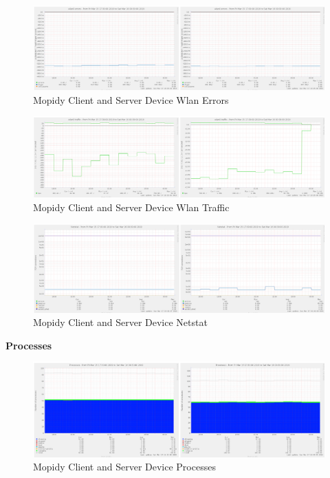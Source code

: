 \documentclass[11pt,a4paper]{scrreprt}
\begin{document}
\begin{figure}[H]
\includegraphics{ResultsAndAnalysis/MopidyServerTestImages/022MopidyWlan0Errors.png}
\centering
\caption{Mopidy Client and Server Device Wlan Errors}
\label{MopidyWlanError}
\end{figure}

\begin{figure}[H]
\includegraphics{ResultsAndAnalysis/MopidyServerTestImages/023MopidyWlan0Traffic.png}
\centering
\caption{Mopidy Client and Server Device Wlan Traffic}
\label{MopidyWlanTraffic}
\end{figure}

\begin{figure}[H]
\includegraphics{ResultsAndAnalysis/MopidyServerTestImages/018MopidyNetstat.png}
\centering
\caption{Mopidy Client and Server Device Netstat}
\label{MopidyNetstat}
\end{figure}

\textbf{Processes}

\begin{figure}[H]
\includegraphics{ResultsAndAnalysis/MopidyServerTestImages/020MopidyProcesses.png}
\centering
\caption{Mopidy Client and Server Device Processes}
\label{MopidyProcesses}
\end{figure}
\end{document}
